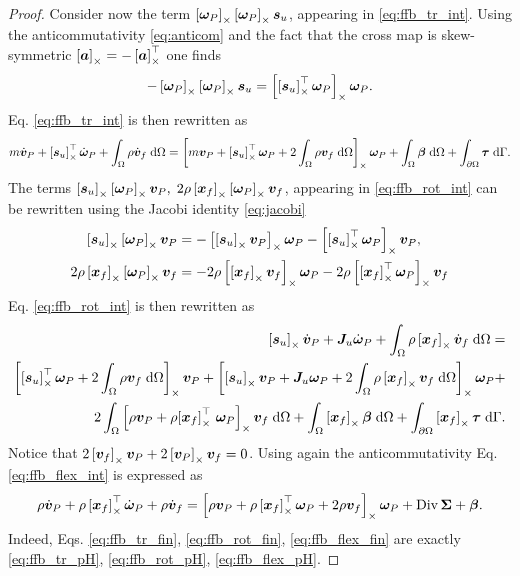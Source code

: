 \begin{proof}
Consider now the term $\left[\bm{\omega}_P\right]_\times \left[\bm{\omega}_P\right]_\times \bm{s}_u$, appearing in \eqref{eq:ffb_tr_int}. Using the anticommutativity \eqref{eq:anticom} and the fact that the cross map is skew-symmetric $\left[\bm{a}\right]_\times = -\left[\bm{a}\right]_\times^\top$ one finds
\begin{align*}
-\left[\bm{\omega}_P\right]_\times \left[\bm{\omega}_P\right]_\times \bm{s}_u = \left[\left[\bm{s}_u\right]_\times^\top\bm{\omega}_{P}\right]_\times \bm{\omega}_{P}.
\end{align*}
Eq. \eqref{eq:ffb_tr_int} is then rewritten as
\begin{equation}
\label{eq:ffb_tr_fin}
m\dot{\bm{v}}_P + \crmat{\bm{s}_u}^\top \dot{\bm{\omega}}_P +   \int_{\Omega} \rho \dot{\bm{v}}_f \d{\Omega}  = 
\crmat{m \bm{v}_P + \crmat{\bm{s}_u}^\top \bm\omega_P +2 \int_{\Omega} \rho \bm{v}_f \d{\Omega}} \bm\omega_P +  \int_{\Omega} \bm\beta \d{\Omega} + \int_{\partial \Omega} \bm\tau \d{\Gamma}.
\end{equation}
The terms $\left[\bm{s}_u\right]_\times \left[\bm{\omega}_P\right]_\times \bm{v}_P, \; 2\rho \left[\bm{x}_f\right]_\times \left[\bm\omega_P\right]_\times {\bm{v}}_f$, appearing in \eqref{eq:ffb_rot_int} can be rewritten using the Jacobi identity \eqref{eq:jacobi}
\begin{align}
\left[\bm{s}_u\right]_\times \left[\bm{\omega}_P\right]_\times \bm{v}_P &= - \left[\left[\bm{s}_u\right]_\times \bm{v}_P\right]_\times \bm{\omega}_P - \left[\left[\bm{s}_u\right]_\times^\top \bm{\omega}_P\right]_\times \bm{v}_P, \\
2\rho \left[\bm{x}_f\right]_\times \left[\bm\omega_P\right]_\times {\bm{v}}_f &= - 2\rho \left[\left[\bm{x}_f\right]_\times \bm{v}_f\right]_\times\bm\omega_P - 2\rho \left[\left[\bm{x}_f\right]_\times^\top \bm\omega_P\right]_\times \bm{v}_f
\end{align}
Eq. \eqref{eq:ffb_rot_int} is then rewritten as
\begin{equation}
\label{eq:ffb_rot_fin}
\begin{split}
\crmat{\bm{s}_u} \dot{\bm{v}}_P  + \bm{J}_u \dot{\bm\omega}_P + \int_{\Omega} \rho \crmat{\bm{x}_f} \dot{\bm{v}}_f \d{\Omega} = \\
\crmat{\crmat{\bm{s}_u}^\top \bm\omega_P + 2 \int_{\Omega} \rho \bm{v}_f \d{\Omega}} \bm{v}_P + \crmat{\crmat{\bm{s}_u} \bm{v}_P + \bm{J}_u \bm\omega_P + 2 \int_{\Omega} \rho \crmat{\bm{x}_f} {\bm{v}}_f \d{\Omega}} \bm\omega_P + 
\\
2 \int_{\Omega} \crmat{\rho {\bm{v}_P} + \rho {\crmat{\bm{x}_f}^\top \, \bm\omega_P}} \bm{v}_f \d{\Omega} + \int_{\Omega}\crmat{\bm{x}_f} \bm\beta \d{\Omega} + \int_{\partial \Omega}\crmat{\bm{x}_f} \bm{\tau} \d{\Gamma}.
\end{split}
\end{equation}
Notice that $2 \left[\bm{v}_f\right]_\times\bm{v}_P + 2 \left[\bm{v}_P\right]_\times\bm{v}_f = 0$. Using again the anticommutativity Eq. \eqref{eq:ffb_flex_int} is expressed as 
\begin{equation}
\label{eq:ffb_flex_fin}
\rho \dot{\bm{v}}_P + \rho \left[\bm{x}_f\right]_\times^\top \dot{\bm\omega}_P  + \rho \dot{\bm{v}}_f = 
\left[\rho \bm{v}_P + \rho \left[\bm{x}_f\right]_\times^\top \bm\omega_P + 2 \rho \bm{v}_f\right]_\times \bm\omega_P + \operatorname*{Div}{\bm\Sigma} + \bm\beta.
\end{equation}
Indeed, Eqs. \eqref{eq:ffb_tr_fin}, \eqref{eq:ffb_rot_fin}, \eqref{eq:ffb_flex_fin} are exactly \eqref{eq:ffb_tr_pH}, \eqref{eq:ffb_rot_pH}, \eqref{eq:ffb_flex_pH}.
\end{proof}

